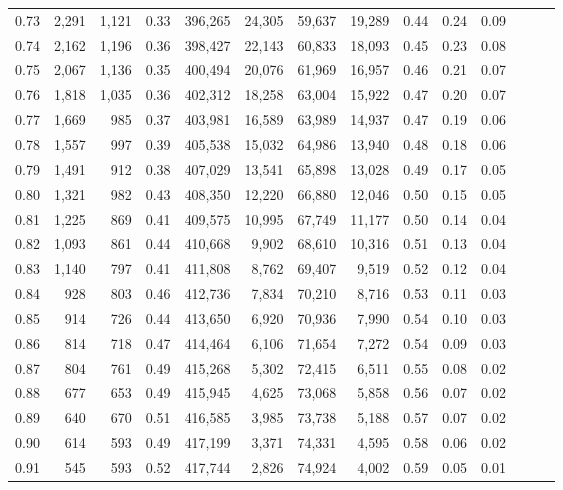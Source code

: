 \begin{tabular}{rrrrrrrrrrrrrr}
0.73 &  2,291 &  1,121 &  0.33 &  396,265 &   24,305 &  59,637 &  19,289 &  0.44 &  0.24 &      0.09 \\
0.74 &  2,162 &  1,196 &  0.36 &  398,427 &   22,143 &  60,833 &  18,093 &  0.45 &  0.23 &      0.08 \\
0.75 &  2,067 &  1,136 &  0.35 &  400,494 &   20,076 &  61,969 &  16,957 &  0.46 &  0.21 &      0.07 \\
0.76 &  1,818 &  1,035 &  0.36 &  402,312 &   18,258 &  63,004 &  15,922 &  0.47 &  0.20 &      0.07 \\
0.77 &  1,669 &    985 &  0.37 &  403,981 &   16,589 &  63,989 &  14,937 &  0.47 &  0.19 &      0.06 \\
0.78 &  1,557 &    997 &  0.39 &  405,538 &   15,032 &  64,986 &  13,940 &  0.48 &  0.18 &      0.06 \\
0.79 &  1,491 &    912 &  0.38 &  407,029 &   13,541 &  65,898 &  13,028 &  0.49 &  0.17 &      0.05 \\
0.80 &  1,321 &    982 &  0.43 &  408,350 &   12,220 &  66,880 &  12,046 &  0.50 &  0.15 &      0.05 \\
0.81 &  1,225 &    869 &  0.41 &  409,575 &   10,995 &  67,749 &  11,177 &  0.50 &  0.14 &      0.04 \\
0.82 &  1,093 &    861 &  0.44 &  410,668 &    9,902 &  68,610 &  10,316 &  0.51 &  0.13 &      0.04 \\
0.83 &  1,140 &    797 &  0.41 &  411,808 &    8,762 &  69,407 &   9,519 &  0.52 &  0.12 &      0.04 \\
0.84 &    928 &    803 &  0.46 &  412,736 &    7,834 &  70,210 &   8,716 &  0.53 &  0.11 &      0.03 \\
0.85 &    914 &    726 &  0.44 &  413,650 &    6,920 &  70,936 &   7,990 &  0.54 &  0.10 &      0.03 \\
0.86 &    814 &    718 &  0.47 &  414,464 &    6,106 &  71,654 &   7,272 &  0.54 &  0.09 &      0.03 \\
0.87 &    804 &    761 &  0.49 &  415,268 &    5,302 &  72,415 &   6,511 &  0.55 &  0.08 &      0.02 \\
0.88 &    677 &    653 &  0.49 &  415,945 &    4,625 &  73,068 &   5,858 &  0.56 &  0.07 &      0.02 \\
0.89 &    640 &    670 &  0.51 &  416,585 &    3,985 &  73,738 &   5,188 &  0.57 &  0.07 &      0.02 \\
0.90 &    614 &    593 &  0.49 &  417,199 &    3,371 &  74,331 &   4,595 &  0.58 &  0.06 &      0.02 \\
0.91 &    545 &    593 &  0.52 &  417,744 &    2,826 &  74,924 &   4,002 &  0.59 &  0.05 &      0.01 \\

\end{tabular}
